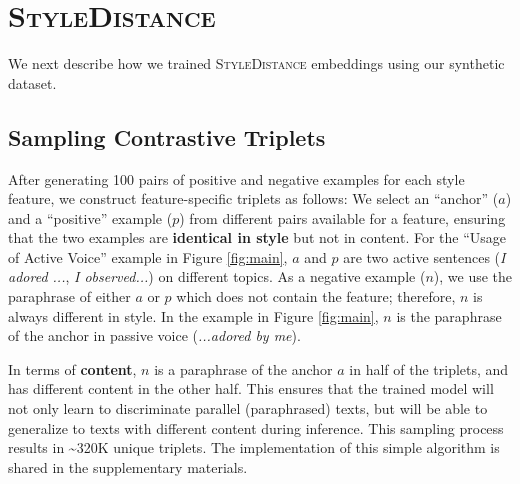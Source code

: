 \section{\textsc{StyleDistance}}
\label{sec:styledistance}

We next describe how we trained \textsc{StyleDistance} embeddings using our synthetic dataset.

\subsection{Sampling Contrastive Triplets}
\label{sec:triplets}

After generating 100 pairs of positive and negative examples for each style feature, we construct feature-specific triplets as follows:  %
 We select an ``anchor'' ($a$) and a ``positive'' example ($p$) %
 from different pairs available for a %
feature, ensuring that the two examples are {\bf identical in style}  but not in content. For the ``Usage of Active Voice'' example in Figure \ref{fig:main}, %
$a$ and $p$ are two active sentences (\textit{I adored ...}, \textit{I observed...}) on  different topics. 
As a negative example ($n$), we use 
the paraphrase of either $a$ or $p$   %
which does not contain the feature; therefore, $n$ %
is  always different in style. %
In the example in Figure \ref{fig:main}, $n$ is the paraphrase of the anchor in passive voice (\textit{...adored by me}). 

In terms of {\bf content}, $n$ %
is a paraphrase of the anchor $a$ in half of the triplets, and  has different content in the other half. %
This ensures that the trained model will not only learn to %
discriminate parallel (paraphrased) texts, but will be able to generalize to texts with different content during inference. This sampling process results in \textasciitilde 320K unique triplets. The implementation of this simple algorithm is shared in the supplementary materials.

